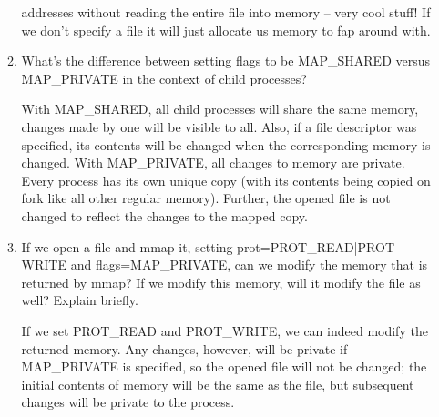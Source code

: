 \begin{enumerate}
\begin{enumerate}
\begin{ans}
      addresses without reading the entire file into memory -- very cool stuff!
      If we don't specify a file it will just allocate us memory to fap around with.
    \end{ans}
  \item  What’s the difference between setting flags to be MAP\_SHARED versus
    MAP\_PRIVATE in the context of child processes?
    \begin{ans}
      With MAP\_SHARED, all child processes will share the same memory, changes made by one will be visible
to all. Also, if a file descriptor was specified, its contents will be changed when the corresponding memory is
changed. With MAP\_PRIVATE, all changes to memory are private. Every process has its own unique copy
(with its contents being copied on fork like all other regular memory). Further, the opened file is not changed
to reflect the changes to the mapped copy.
\end{ans}
\item  If we open a file and mmap it, setting prot=PROT\_READ|PROT WRITE and flags=MAP\_PRIVATE, can we
modify the memory that is returned by mmap? If we modify this memory, will it
modify the file as well? Explain briefly.
\begin{ans}
   If we set PROT\_READ and PROT\_WRITE, we can indeed modify the returned memory. Any changes,
however, will be private if MAP\_PRIVATE is specified, so the opened file will not be changed; the initial
contents of memory will be the same as the file, but subsequent changes will be private to the process.
\end{ans}



  \end{enumerate}
\end{enumerate}
